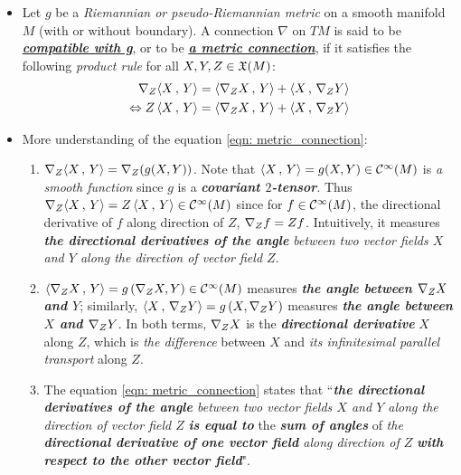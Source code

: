 \documentclass[11pt]{article}
\begin{document}
\begin{itemize}
\item \begin{definition}
Let $g$ be a \emph{Riemannian or pseudo-Riemannian metric} on a smooth manifold $M$ (with or without boundary). A connection $\nabla$ on $TM$ is said to be \underline{\emph{\textbf{compatible with g}}}, or to be \underline{\emph{\textbf{a metric connection}}}, if it satisfies the following \emph{product rule} for all
$X, Y, Z \in {\mathfrak X}(M)$:
\begin{align}
 \nabla_{Z}{\left\langle X\,,\, Y \right\rangle} &= \left\langle \nabla_{Z}{X}\,,\, Y \right\rangle + \left\langle X\,,\, \nabla_{Z}{Y} \right\rangle \label{eqn: metric_connection} \\
\Leftrightarrow Z\left\langle X\,,\, Y \right\rangle &= \left\langle \nabla_{Z}{X}\,,\, Y \right\rangle + \left\langle X\,,\, \nabla_{Z}{Y} \right\rangle \nonumber
\end{align} 
\end{definition}


\item \begin{remark} More understanding of the equation \eqref{eqn: metric_connection}:
\begin{enumerate}
\item $\nabla_{Z}{\left\langle X\,,\, Y \right\rangle} = \nabla_{Z}{(g(X, Y))}$. Note that $\left\langle X\,,\, Y \right\rangle = g(X, Y) \in {\mathcal C}^{\infty}(M)$ is \emph{a smooth function} since $g$ is a \emph{\textbf{covariant $2$-tensor}}.  Thus $\nabla_{Z}{\left\langle X\,,\, Y \right\rangle} = Z\left\langle X\,,\, Y \right\rangle \in {\mathcal C}^{\infty}(M)$ since for $f \in {\mathcal C}^{\infty}(M)$, the directional derivative of $f$ along direction of $Z$, $\nabla_{Z}{f} = Zf$. Intuitively, it measures \emph{\textbf{the directional derivatives of the angle} between two vector fields $X$ and $Y$ along the direction of vector field $Z$}.

\item $\left\langle \nabla_{Z}{X}\,,\, Y \right\rangle = g\left(\nabla_{Z}{X}, Y\right) \in {\mathcal C}^{\infty}(M)$ measures \emph{\textbf{the angle between $\nabla_{Z}{X}$ and $Y$}}; similarly, $\left\langle X\,,\, \nabla_{Z}{Y} \right\rangle = g\left(X, \nabla_{Z}{Y}\right)$ measures \emph{\textbf{the angle between $X$ and $\nabla_{Z}{Y}$}}. In both terms,  $\nabla_{Z}{X}$ is the \emph{\textbf{directional derivative}} $X$ along $Z$, which is \emph{the difference} between $X$ and \emph{its infinitesimal parallel transport} along $Z$. 

\item The equation \eqref{eqn: metric_connection} states that  ``\emph{\textbf{the directional derivatives of the angle} between two vector fields $X$ and $Y$ along the direction of vector field $Z$} \emph{\textbf{is equal to}} the \emph{\textbf{sum of angles}} of \emph{the \textbf{directional derivative of one vector field} along direction of $Z$} \emph{\textbf{with respect to the other vector field}}".
\end{enumerate}
\end{remark}


\end{itemize}
\end{document}
